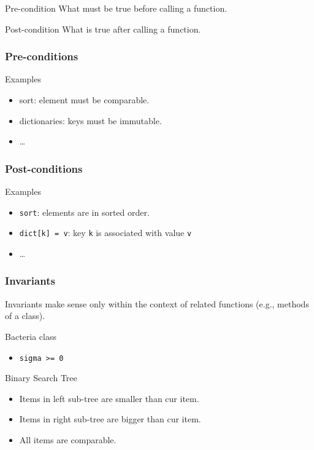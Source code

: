 \begin{frame}[fragile]

\begin{block}{Pre-condition}
What must be true before calling a function.
\end{block}

\begin{block}{Post-condition}
What is true after calling a function.
\end{block}
\end{frame}

\begin{frame}[fragile]
\frametitle{Pre-conditions}

\begin{block}{Examples}
\begin{itemize}
\item sort: element must be comparable.
\item dictionaries: keys must be immutable.
\item \ldots
\end{itemize}
\end{block}
\end{frame}

\begin{frame}[fragile]
\frametitle{Post-conditions}

\begin{block}{Examples}
\begin{itemize}
\item \lstinline{sort}: elements are in sorted order.
\item \lstinline{dict[k] = v}: key \lstinline{k} is associated with value \lstinline{v}
\item \ldots
\end{itemize}
\end{block}
\end{frame}

\begin{frame}[fragile]
\frametitle{Invariants}
Invariants make sense only within the context of related functions (e.g., methods of a class).
\end{frame}

\begin{frame}[fragile]
\begin{block}{Bacteria class}
\begin{itemize}
\item \lstinline{sigma >= 0}
\end{itemize}
\end{block}

\begin{block}{Binary Search Tree}
\begin{itemize}
\item Items in left sub-tree are smaller than cur item.
\item Items in right sub-tree are bigger than cur item.
\item All items are comparable.
\end{itemize}
\end{block}
\end{frame}

